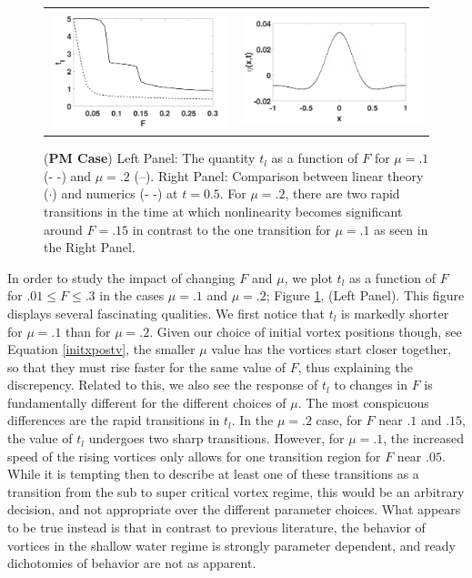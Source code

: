 \documentclass[a4paper,11pt]{article}
\begin{document}
%
\begin{figure}[!h]
\centering
\begin{tabular}{cc}
\includegraphics[width=.46\textwidth]{froude_lin}& \includegraphics[width=.5\textwidth]{lin_response_tf_pt5} \\
\end{tabular}
\caption{\small ({\bf PM Case}) Left Panel: The quantity $t_{l}$ as a function of $F$  for $\mu=.1$ (- -) and $\mu=.2$ (--).  Right Panel: Comparison between linear theory ($\cdot$) and numerics (- -) at $t=0.5$.  For $\mu=.2$, there are two rapid transitions in the time at which nonlinearity becomes significant around $F=.15$ in contrast to the one transition for $\mu=.1$ as seen in the Right Panel.}
\label{fig:linrep}
\end{figure}
In order to study the impact of changing $F$ and $\mu$, we plot $t_{l}$ as a function of $F$ for $.01\leq F \leq .3$ in the cases $\mu=.1$ and $\mu=.2$; Figure \ref{fig:linrep}, (Left Panel).  This figure displays several fascinating qualities.  We first notice that $t_{l}$ is markedly shorter for $\mu=.1$ than for $\mu=.2$.  Given our choice of initial vortex positions though, see Equation \eqref{initxpostv}, the smaller $\mu$ value has the vortices start closer together, so that they must rise faster for the same value of $F$, thus explaining the discrepency.  Related to this, we also see the response of $t_{l}$ to changes in $F$ is fundamentally different for the different choices of $\mu$.  The most conspicuous differences are the rapid transitions in $t_{l}$.  In the $\mu=.2$ case, for $F$ near $.1$ and $.15$, the value of $t_{l}$ undergoes two sharp transitions.  However, for $\mu=.1$, the increased speed of the rising vortices only allows for one transition region for $F$ near $.05$.  While it is tempting then to describe at least one of these transitions as a transition from the sub to super critical vortex regime, this would be an arbitrary decision, and not appropriate over the different parameter choices.  What appears to be true instead is that in contrast to previous literature, the behavior of vortices in the shallow water regime is strongly parameter dependent, and ready dichotomies of behavior are not as apparent.  
\end{document}
